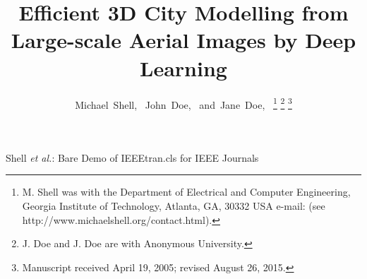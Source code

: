 \documentclass[journal]{IEEEtran}
\begin{document}
\title{Efficient 3D City Modelling from Large-scale Aerial Images by Deep Learning}
%
%
%

\author{Michael~Shell,~
        John~Doe,~
        and~Jane~Doe,~%
\thanks{M. Shell was with the Department
of Electrical and Computer Engineering, Georgia Institute of Technology, Atlanta,
GA, 30332 USA e-mail: (see http://www.michaelshell.org/contact.html).}%
\thanks{J. Doe and J. Doe are with Anonymous University.}%
\thanks{Manuscript received April 19, 2005; revised August 26, 2015.}}

%
{Shell \MakeLowercase{\textit{et al.}}: Bare Demo of IEEEtran.cls for IEEE Journals}
\maketitle


\IEEEpeerreviewmaketitle








\end{document}
